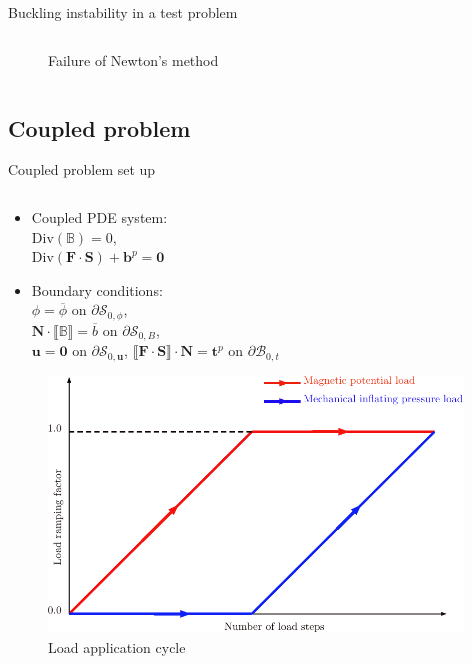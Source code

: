 \documentclass{beamer}
\begin{document}
\begin{frame}{Buckling instability in a test problem}
{\begin{columns}
\begin{column}{0.49\textwidth}
\begin{figure}[h]
\caption{Failure of Newton's method \cite{Vasios}}
\end{figure}
\end{column}
\end{columns}
}%
\end{frame}

\subsection{Coupled problem}
\begin{frame}{Coupled problem set up}
\begin{columns}
\begin{column}{0.45\textwidth}
\begin{itemize}
\item Coupled PDE system: \\
$\text{Div}(\mathbb{B}) = 0$, \\
$\text{Div}(\mathbf{F} \cdot \mathbf{S}) + \mathbf{b}^p = \mathbf{0}$
\item Boundary conditions:\\ 
$\phi = \overline{\phi}$ on $\partial \mathcal{S}_{0,\phi}$,\\
$\mathbf{N} \cdot \llbracket \mathbb{B} \rrbracket = \overline{b}$ on $\partial \mathcal{S}_{0,B}$,\\
$\mathbf{u} = \mathbf{0}$ on $\partial \mathcal{S}_{0,\mathbf{u}}$, $ \llbracket \mathbf{F} \cdot \mathbf{S} \rrbracket \cdot \mathbf{N} = \mathbf{t}^p$ on $\partial\mathcal{B}_{0,t}$
\end{itemize}
\begin{figure}[h]
\centering
\includegraphics[width=0.98\textwidth]{load_cycle.pdf}
\caption{Load application cycle}
\end{figure}
\end{column}

\end{columns}
\end{frame}
\end{document}
